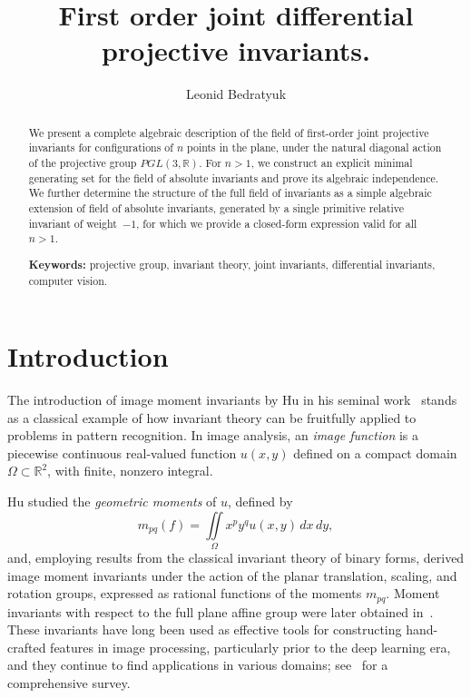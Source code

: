\documentclass[12pt,reqno]{amsart}
\begin{document}
\noindent

\title { First order  joint  differential projective invariants.} 

\author{Leonid Bedratyuk} 

\begin{abstract}  


We present a complete algebraic description of the field of first-order joint projective invariants for configurations of \( n \) points in the plane, under the natural diagonal action of the projective group \( PGL(3,\mathbb{R}) \). For  \( n > 1 \), we construct an explicit minimal generating set for the field of absolute invariants and prove its algebraic independence. We further determine the structure of the full field of invariants as a simple algebraic extension of field of absolute invariants, generated by a single primitive relative invariant of weight~$-1$, for which we provide a closed-form expression valid for all \( n > 1 \).

\textbf{Keywords:}
projective group, invariant theory,  joint invariants, differential invariants,  computer vision.
\end{abstract}





\maketitle 






\section{Introduction}

The introduction of image moment invariants by Hu in his seminal work~\cite{Hu} stands as a classical example of how invariant theory can be fruitfully applied to problems in pattern recognition. In image analysis, an \emph{image function} is a piecewise continuous real-valued function \( u(x,y) \) defined on a compact domain \( \Omega \subset \mathbb{R}^2 \), with finite, nonzero integral.

Hu studied the \emph{geometric moments} of \( u \), defined by
\[
m_{pq}(f) = \iint\limits_{\Omega} x^p y^q u(x,y)\, dx\, dy,
\]
and, employing results from the classical invariant theory of binary forms, derived image moment invariants under the action of the planar translation, scaling, and rotation groups, expressed as rational functions of the moments \( m_{pq} \). Moment invariants with respect to the full plane affine group were later obtained in~\cite{SF}. These invariants have long been used as effective tools for constructing hand-crafted features in image processing, particularly prior to the deep learning era, and they continue to find applications in various domains; see~\cite{FSB} for a comprehensive survey.
\end{document}
